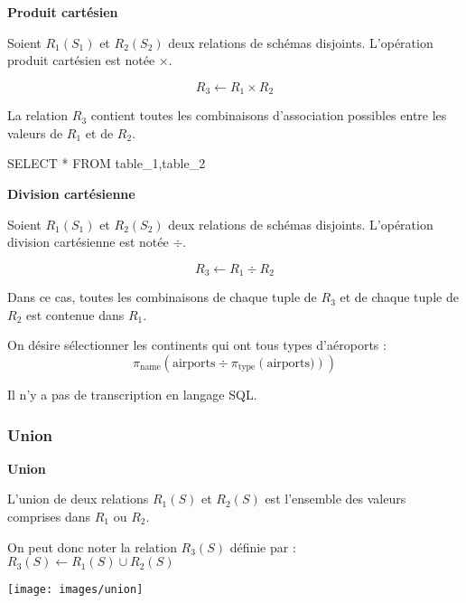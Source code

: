 \documentclass[10pt]{article}
\begin{document}
\begin{defi}

\textbf{Produit cartésien}

Soient $R_1(S_1)$ et $R_2(S_2)$ deux relations de schémas disjoints. L'opération produit cartésien est notée $\times$. 

$$
R_3 \leftarrow R_1 \times R_2
$$

La relation $R_3$ contient toutes les combinaisons d'association possibles entre les valeurs de $R_1$ et de $R_2$.

\begin{envsql}
\begin{sql}
SELECT * FROM table_1,table_2
\end{sql}
\end{envsql}

\end{defi}



\begin{defi}

\textbf{Division cartésienne}

Soient $R_1(S_1)$ et $R_2(S_2)$ deux relations de schémas disjoints. L'opération division cartésienne est notée $\div$. 

$$
R_3 \leftarrow R_1 \div R_2
$$

Dans ce cas, toutes les combinaisons de chaque tuple de $R_3$ et de chaque tuple de $R_2$ est contenue dans $R_1$.

\end{defi}


\begin{exemple}
On désire sélectionner les continents qui ont tous types d'aéroports :
$$
\pi_{\text{name}}\left(\text{airports} \div \pi_{\text{type}}\left( \text{airports})\right)\right)
$$

Il n'y a pas de transcription en langage SQL.
\end{exemple}



\subsubsection{Union}

\begin{defi}
\begin{minipage}[c]{.75\linewidth}
\textbf{Union}

L'union de deux relations $R_1(S)$ et $R_2(S)$ est l'ensemble des valeurs comprises dans $R_1$ ou $R_2$. 

On peut donc noter la relation $R_3(S)$ définie par : $R_3(S)\leftarrow R_1(S)\cup R_2(S)$
\end{minipage}\hfill
\begin{minipage}[c]{.2\linewidth}
\begin{center}
\texttt{[image: images/union]}
\end{center}
\end{minipage}

\end{defi}
\end{document}
